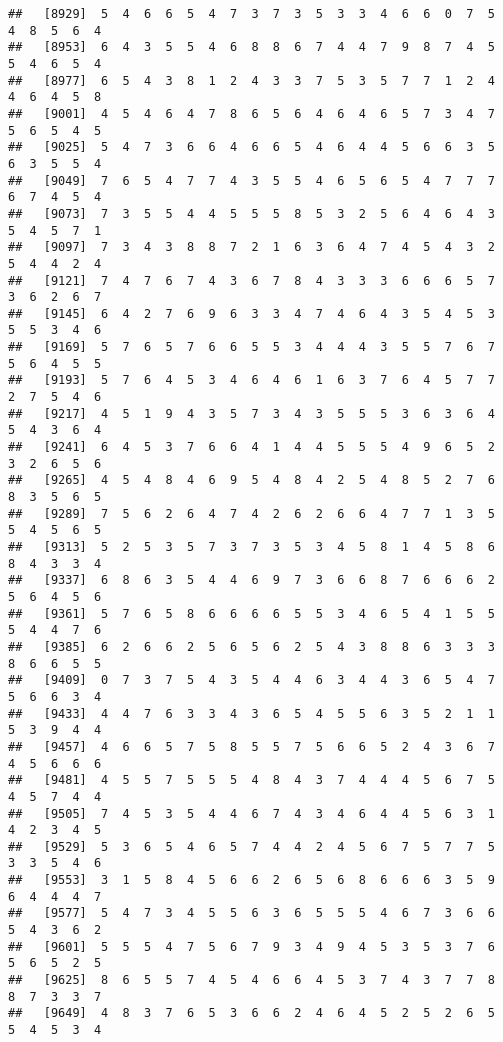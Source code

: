 \documentclass[
]{book}
\begin{document}
\begin{verbatim}
##   [8929]  5  4  6  6  5  4  7  3  7  3  5  3  3  4  6  6  0  7  5  4  8  5  6  4
##   [8953]  6  4  3  5  5  4  6  8  8  6  7  4  4  7  9  8  7  4  5  5  4  6  5  4
##   [8977]  6  5  4  3  8  1  2  4  3  3  7  5  3  5  7  7  1  2  4  4  6  4  5  8
##   [9001]  4  5  4  6  4  7  8  6  5  6  4  6  4  6  5  7  3  4  7  5  6  5  4  5
##   [9025]  5  4  7  3  6  6  4  6  6  5  4  6  4  4  5  6  6  3  5  6  3  5  5  4
##   [9049]  7  6  5  4  7  7  4  3  5  5  4  6  5  6  5  4  7  7  7  6  7  4  5  4
##   [9073]  7  3  5  5  4  4  5  5  5  8  5  3  2  5  6  4  6  4  3  5  4  5  7  1
##   [9097]  7  3  4  3  8  8  7  2  1  6  3  6  4  7  4  5  4  3  2  5  4  4  2  4
##   [9121]  7  4  7  6  7  4  3  6  7  8  4  3  3  3  6  6  6  5  7  3  6  2  6  7
##   [9145]  6  4  2  7  6  9  6  3  3  4  7  4  6  4  3  5  4  5  3  5  5  3  4  6
##   [9169]  5  7  6  5  7  6  6  5  5  3  4  4  4  3  5  5  7  6  7  5  6  4  5  5
##   [9193]  5  7  6  4  5  3  4  6  4  6  1  6  3  7  6  4  5  7  7  2  7  5  4  6
##   [9217]  4  5  1  9  4  3  5  7  3  4  3  5  5  5  3  6  3  6  4  5  4  3  6  4
##   [9241]  6  4  5  3  7  6  6  4  1  4  4  5  5  5  4  9  6  5  2  3  2  6  5  6
##   [9265]  4  5  4  8  4  6  9  5  4  8  4  2  5  4  8  5  2  7  6  8  3  5  6  5
##   [9289]  7  5  6  2  6  4  7  4  2  6  2  6  6  4  7  7  1  3  5  5  4  5  6  5
##   [9313]  5  2  5  3  5  7  3  7  3  5  3  4  5  8  1  4  5  8  6  8  4  3  3  4
##   [9337]  6  8  6  3  5  4  4  6  9  7  3  6  6  8  7  6  6  6  2  5  6  4  5  6
##   [9361]  5  7  6  5  8  6  6  6  6  5  5  3  4  6  5  4  1  5  5  5  4  4  7  6
##   [9385]  6  2  6  6  2  5  6  5  6  2  5  4  3  8  8  6  3  3  3  8  6  6  5  5
##   [9409]  0  7  3  7  5  4  3  5  4  4  6  3  4  4  3  6  5  4  7  5  6  6  3  4
##   [9433]  4  4  7  6  3  3  4  3  6  5  4  5  5  6  3  5  2  1  1  5  3  9  4  4
##   [9457]  4  6  6  5  7  5  8  5  5  7  5  6  6  5  2  4  3  6  7  4  5  6  6  6
##   [9481]  4  5  5  7  5  5  5  4  8  4  3  7  4  4  4  5  6  7  5  4  5  7  4  4
##   [9505]  7  4  5  3  5  4  4  6  7  4  3  4  6  4  4  5  6  3  1  4  2  3  4  5
##   [9529]  5  3  6  5  4  6  5  7  4  4  2  4  5  6  7  5  7  7  5  3  3  5  4  6
##   [9553]  3  1  5  8  4  5  6  6  2  6  5  6  8  6  6  6  3  5  9  6  4  4  4  7
##   [9577]  5  4  7  3  4  5  5  6  3  6  5  5  5  4  6  7  3  6  6  5  4  3  6  2
##   [9601]  5  5  5  4  7  5  6  7  9  3  4  9  4  5  3  5  3  7  6  5  6  5  2  5
##   [9625]  8  6  5  5  7  4  5  4  6  6  4  5  3  7  4  3  7  7  8  8  7  3  3  7
##   [9649]  4  8  3  7  6  5  3  6  6  2  4  6  4  5  2  5  2  6  5  5  4  5  3  4

\end{verbatim}
\end{document}
